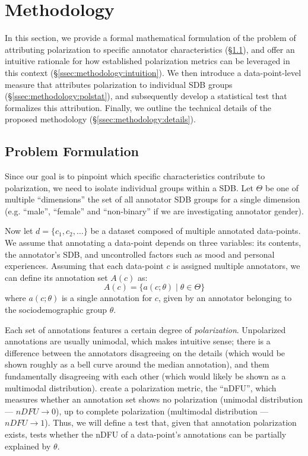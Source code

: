 \documentclass{article}
\begin{document}
\section{Methodology}
\label{sec:methodology}

In this section, we provide a formal mathematical formulation of the problem of attributing polarization to specific annotator characteristics (\S\ref{ssec:methodology:problem}), and offer an intuitive rationale for how established polarization metrics can be leveraged in this context (\S\ref{ssec:methodology:intuition}). We then introduce a data-point-level measure that attributes polarization to individual \ac{SDB} groups (\S\ref{ssec:methodology:polstat}), and subsequently develop a statistical test that formalizes this attribution. Finally, we outline the technical details of the proposed methodology (\S\ref{ssec:methodology:details}).


\subsection{Problem Formulation}
\label{ssec:methodology:problem}

Since our goal is to pinpoint which specific characteristics contribute to polarization, we need to isolate individual groups within a \ac{SDB}. Let $\Theta$ be one of multiple ``dimensions'' the set of all annotator \ac{SDB} groups for a single dimension (e.g. ``male'', ``female'' and ``non-binary'' if we are investigating annotator gender).

Now let $d = \{c_1, c_2, \ldots\}$ be a dataset composed of multiple annotated data-points. We assume that annotating a data-point depends on three variables: its contents, the annotator's \ac{SDB}, and uncontrolled factors such as mood and personal experiences. Assuming that each data-point $c$ is assigned multiple annotators, we can define its annotation set $A(c)$ as:
\begin{equation}
    A(c) = \{a(c; \theta) \mid \theta \in \Theta \}
\end{equation}
\noindent where  $a(c; \theta)$ is a single annotation for $c$, given by an annotator belonging to the sociodemographic group $\theta$.

Each set of annotations features a certain degree of \textit{polarization}. Unpolarized annotations are usually unimodal, which makes intuitive sense; there is a difference between the annotators disagreeing on the details (which would be shown roughly as a bell curve around the median annotation), and them fundamentally disagreeing with each other (which would likely be shown as a multimodal distribution). \textcite{pavlopoulos-likas-2024} create a polarization metric, the ``\ac{nDFU}'', which measures whether an annotation set shows no polarization (unimodal distribution --- $nDFU \rightarrow 0$), up to complete polarization (multimodal distribution --- $nDFU \rightarrow 1$). Thus, we will define a test that, given that annotation polarization exists, tests whether the \ac{nDFU} of a data-point's annotations can be partially explained by $\theta$.
\end{document}
